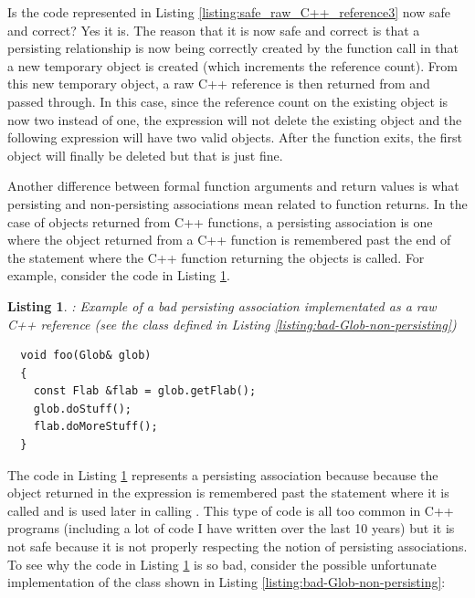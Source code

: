 \documentclass[pdf,ps2pdf,11pt]{SANDreport}
\newtheorem{listing}{Listing}
\begin{document}
Is the code represented in Listing
{}\ref{listing:safe_raw_C++_reference3} now safe and correct?  Yes it
is.  The reason that it is now safe and correct is that a persisting
relationship is now being correctly created by the function call
{} in that a new temporary {}
object is created (which increments the reference count).  From this
new temporary {} object, a raw C++ reference is then
returned from {} and passed through.  In this
case, since the reference count on the existing {} object is
now two instead of one, the expression {} will
not delete the existing {} object and the following
expression {} will have two valid
{} objects.  After the function
{} exits, the first
{} object will finally be deleted but that is just fine.

Another difference between formal function arguments and return values
is what persisting and non-persisting associations mean related to
function returns.  In the case of objects returned from C++ functions,
a persisting association is one where the object returned from a C++
function is remembered past the end of the statement where the C++
function returning the objects is called.  For example, consider the
code in Listing {}\ref{listing:persisting-func-return-1}.


{}\begin{listing}: Example of a bad persisting association
implementated as a raw C++ reference (see the {} class
defined in Listing {}\ref{listing:bad-Glob-non-persisting})
\label{listing:persisting-func-return-1}
{\small\begin{verbatim}
  void foo(Glob& glob)
  {
    const Flab &flab = glob.getFlab();
    glob.doStuff();
    flab.doMoreStuff();
  }
\end{verbatim}}
\end{listing}


The code in Listing {}\ref{listing:persisting-func-return-1}
represents a persisting association because because the
{} object returned in the expression {} is remembered past the statement where it is
called and is used later in calling {}.  This
type of code is all too common in C++ programs (including a lot of
code I have written over the last 10 years) but it is not safe because
it is not properly respecting the notion of persisting associations.
To see why the code in Listing
{}\ref{listing:persisting-func-return-1} is so bad, consider the
possible unfortunate implementation of the {} class shown in
Listing {}\ref{listing:bad-Glob-non-persisting}:
\end{document}
